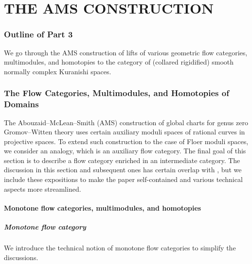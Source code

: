 \documentclass[reqno, 10pt]{amsart}
\numberwithin{equation}{section}
\numberwithin{equation}{section}
\theoremstyle{definition}
\theoremstyle{remark}
\begin{document}
\newpage



\part{THE AMS CONSTRUCTION}



\section*{Outline of Part 3}

We go through the AMS construction of lifts of various geometric flow categories, multimodules, and homotopies to the category of (collared rigidified) smooth normally complex Kuranishi spaces. 




\section{The Flow Categories, Multimodules, and Homotopies of Domains}\label{section_AMS_domains}





The Abouzaid--McLean--Smith (AMS) construction of global charts for genus zero Gromov--Witten theory \cite{AMS} uses certain auxiliary moduli spaces of rational curves in projective spaces.  To extend such construction to the case of Floer moduli spaces, we consider an analogy, which is an auxiliary flow category. The final goal of this section is to describe a flow category enriched in an intermediate category. The discussion in this section and subsequent ones has certain overlap with \cite[Section 5]{Bai_Xu_Arnold}, but we include these expositions to make the paper self-contained and various technical aspects more streamlined.



\subsection{Monotone flow categories, multimodules, and homotopies}


\subsubsection{Monotone flow category}\label{subsubsec:mono-flow-cat}

We introduce the technical notion of monotone flow categories to simplify the discussions. %
\end{document}
